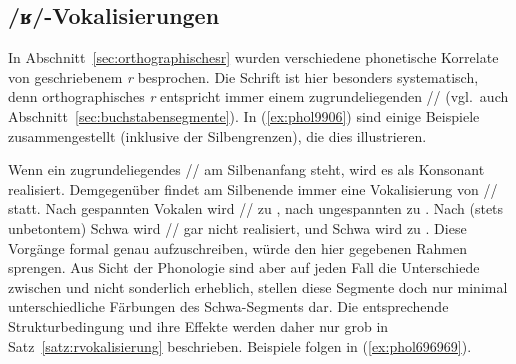
\begin{exe}
  \ex\label{ex:phol8011}
  \begin{xlist}
  \end{xlist}
\end{exe}

\subsection{/ʁ/-Vokalisierungen}

\label{sec:rvokalisierungen}

In Abschnitt~\ref{sec:orthographischesr} wurden verschiedene phonetische Korrelate von geschriebenem \textit{r} besprochen.
Die Schrift ist hier besonders systematisch, denn orthographisches \textit{r} entspricht immer einem zugrundeliegenden // (vgl.\ auch Abschnitt~\ref{sec:buchstabensegmente}).
In (\ref{ex:phol9906}) sind einige Beispiele zusammengestellt (inklusive der Silbengrenzen), die dies illustrieren.

\begin{exe}
  \ex\label{ex:phol9906}
  \begin{xlist}
  \end{xlist}
\end{exe}

Wenn ein zugrundeliegendes // am Silbenanfang steht, wird es als Konsonant \textipa{[K]} realisiert.
Demgegenüber findet am Silbenende immer eine Vokalisierung von // statt.
Nach gespannten Vokalen wird // zu \textipa{[5]}, nach ungespannten zu \textipa{[@]}.
Nach (stets unbetontem) Schwa wird // gar nicht realisiert, und Schwa wird zu \textipa{[5]}.
Diese Vorgänge formal genau aufzuschreiben, würde den hier gegebenen Rahmen sprengen.
Aus Sicht der Phonologie sind aber auf jeden Fall die Unterschiede zwischen \textipa{[@]} und \textipa{[5]} nicht sonderlich erheblich, stellen diese Segmente doch nur minimal unterschiedliche Färbungen des Schwa-Segments dar.
Die entsprechende Strukturbedingung und ihre Effekte werden daher nur grob in Satz~\ref{satz:rvokalisierung} beschrieben.
Beispiele folgen in (\ref{ex:phol696969}).


